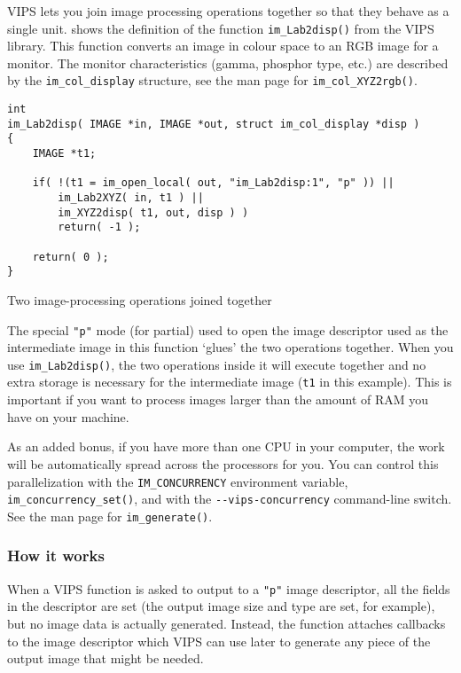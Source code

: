VIPS lets you join image processing operations together so that they
behave as a single unit.  shows the definition of the
function \verb+im_Lab2disp()+ from the VIPS library. This function converts
an image in \cielab{} colour space to an RGB image for a monitor. The
monitor characteristics (gamma, phosphor type, etc.) are described by the
\verb+im_col_display+ structure, see the man page for \verb+im_col_XYZ2rgb()+.

\begin{fig2}
\begin{verbatim}
int 
im_Lab2disp( IMAGE *in, IMAGE *out, struct im_col_display *disp )
{	
    IMAGE *t1;

    if( !(t1 = im_open_local( out, "im_Lab2disp:1", "p" )) ||
        im_Lab2XYZ( in, t1 ) ||
        im_XYZ2disp( t1, out, disp ) )
        return( -1 );

    return( 0 );
}
\end{verbatim}
\caption{Two image-processing operations joined together}
\label{fg:join}
\end{fig2}

The special \verb+"p"+ mode (for partial) used to open the image descriptor
used as the intermediate image in this function `glues' the two operations
together. When you use \verb+im_Lab2disp()+, the two operations inside it
will execute together and no extra storage is necessary for the intermediate
image (\verb+t1+ in this example).  This is important if you want to process
images larger than the amount of RAM you have on your machine.

As an added bonus, if you have more than one CPU in your computer, the work
will be automatically spread across the processors for you. You can control
this parallelization with the \verb+IM_CONCURRENCY+ environment variable,
\verb+im_concurrency_set()+, and with the \verb+--vips-concurrency+
command-line switch. See the man page for \verb+im_generate()+.

\subsubsection{How it works}

When a VIPS function is asked to output to a \verb+"p"+ image descriptor,
all the fields in the descriptor are set (the output image size and type
are set, for example), but no image data is actually generated. Instead,
the function attaches callbacks to the image descriptor which VIPS can use
later to generate any piece of the output image that might be needed.

